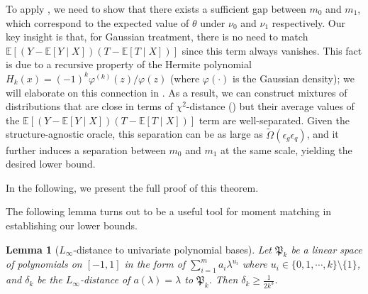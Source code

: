 \documentclass{article}
\def\eps{{\epsilon}}
\newcommand{\E}{\mathbb{E}}
\newtheorem{lemma}{Lemma}[section]
\begin{document}
To apply , we need to show that there exists a sufficient gap between $m_0$ and $m_1$, which correspond to the expected value of $\theta$ under $\nu_0$ and $\nu_1$ respectively.
Our key insight is that, for Gaussian treatment, there is no need to match $\E\left[(Y-\E[Y\mid X])(T-\E[T\mid X])\right]$ since this term always vanishes. This fact is due to a recursive property of the Hermite polynomial $H_k(x) = (-1)^k\varphi^{(k)}(z)/\varphi(z)$ (where $\varphi(\cdot)$ is the Gaussian density); we will elaborate on this connection in . As a result, we can construct mixtures of distributions that are close in terms of $\chi^2$-distance () but their average values of the $\E\left[(Y-\E[Y\mid X])(T-\E[T\mid X])\right]$ term are well-separated. Given the structure-agnostic oracle, this separation can be as large as $\tilde{\Omega}(\eps_g\eps_q)$, and it further induces a separation between $m_0$ and $m_1$ at the same scale, yielding the desired lower bound. 

In the following, we present the full proof of this theorem.


The following lemma turns out to be a useful tool for moment matching in establishing our lower bounds.

\begin{lemma}[$L_{\infty}$-distance to univariate polynomial bases]
    \label{lemma:lagrange-interpolation-derivative}
    Let $\mathfrak{P}_k$ be a linear space of polynomials on $[-1,1]$ in the form of $\sum_{i=1}^m a_i\lambda^{u_i}$ where $u_i\in\{0,1,\cdots,k\}\setminus\{1\}$, and $\delta_k$ be the $L_{\infty}$-distance of $a(\lambda)=\lambda$ to $\mathfrak{P}_k$. Then $\delta_k\geq\frac{1}{2k^3}$.
\end{lemma}
\end{document}
